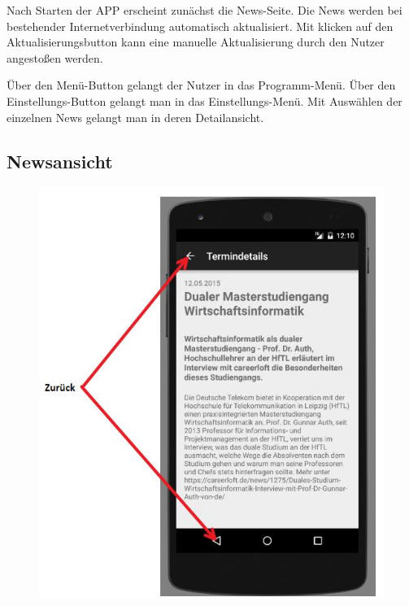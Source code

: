 
Nach Starten der APP erscheint zunächst die News-Seite. Die News werden bei bestehender Internetverbindung automatisch aktualisiert. Mit klicken auf den Aktualisierungsbutton kann eine manuelle Aktualisierung durch den Nutzer angestoßen werden.

Über den Menü-Button gelangt der Nutzer in das Programm-Menü. Über den Einstellungs-Button gelangt man in das Einstellungs-Menü.
Mit Auswählen der einzelnen News gelangt man in deren Detailansicht.

\newpage
\subsection{Newsansicht}
\begin{figure}[h]
	\centering
	\includegraphics[scale=0.8]{03_Bedienungsanleitung/img/news.jpg}
	\label{img:grafik-dummy}
\end{figure}

